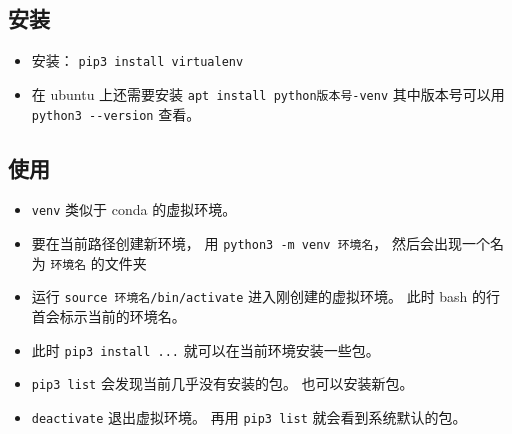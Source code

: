 
\begin{issues}
\issueDraft
\end{issues}


\subsection{安装}
\begin{itemize}
\item 安装： \verb|pip3 install virtualenv|
\item 在 ubuntu 上还需要安装 \verb|apt install python版本号-venv| 其中版本号可以用 \verb|python3 --version| 查看。
\end{itemize}

\subsection{使用}
\begin{itemize}
\item \verb|venv| 类似于 conda 的虚拟环境。
\item 要在当前路径创建新环境， 用 \verb|python3 -m venv 环境名|， 然后会出现一个名为 \verb|环境名| 的文件夹
\item 运行 \verb|source 环境名/bin/activate| 进入刚创建的虚拟环境。 此时 bash 的行首会标示当前的环境名。
\item 此时 \verb|pip3 install ...| 就可以在当前环境安装一些包。
\item \verb|pip3 list| 会发现当前几乎没有安装的包。 也可以安装新包。
\item \verb|deactivate| 退出虚拟环境。 再用 \verb|pip3 list| 就会看到系统默认的包。
\end{itemize}
